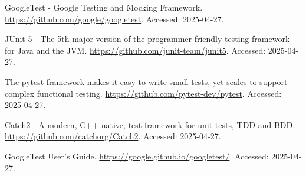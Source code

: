 \documentclass[chinese]{article}
\begin{document}
\newpage
\begin{thebibliography}{99}

    GoogleTest - Google Testing and Mocking Framework.
    \url{https://github.com/google/googletest}.
    Accessed: 2025-04-27.

    JUnit 5 - The 5th major version of the programmer-friendly testing framework for Java and the JVM.
    \url{https://github.com/junit-team/junit5}.
    Accessed: 2025-04-27.

    The pytest framework makes it easy to write small tests, yet scales to support complex functional testing.
    \url{https://github.com/pytest-dev/pytest}.
    Accessed: 2025-04-27.

    Catch2 - A modern, C++-native, test framework for unit-tests, TDD and BDD.
    \url{https://github.com/catchorg/Catch2}.
    Accessed: 2025-04-27.

    GoogleTest User’s Guide.
    \url{https://google.github.io/googletest/}.
    Accessed: 2025-04-27.

\end{thebibliography}
\end{document}
